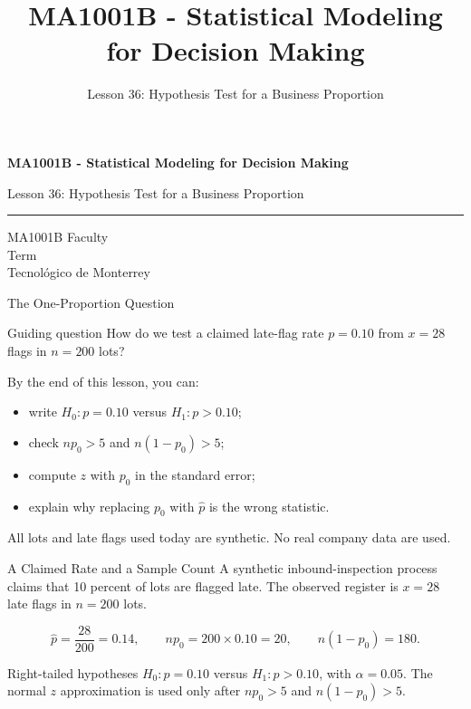 \documentclass[aspectratio=169,10pt,english]{beamer}
\title{MA1001B - Statistical Modeling for Decision Making}
\subtitle{Lesson 36: Hypothesis Test for a Business Proportion}
\author{}
\institute{Tecnol\'ogico de Monterrey}
\date{}
\begin{document}
\begin{frame}[plain]
  \vspace{1.2cm}
  {\Large\bfseries MA1001B - Statistical Modeling for Decision Making\par}
  \vspace{0.7cm}
  {\large Lesson 36: Hypothesis Test for a Business Proportion\par}
  \vspace{0.7cm}
  {\color{TecRojo}\rule{\textwidth}{1.2pt}}
  \vspace{0.8cm}

  MA1001B Faculty\\[0.3cm]
  Term\\[0.3cm]
  Tecnol\'ogico de Monterrey
\end{frame}

\begin{frame}{The One-Proportion Question}
  \begin{alertblock}{Guiding question}
    How do we test a claimed late-flag rate $p=0.10$ from $x=28$ flags in
    $n=200$ lots?
  \end{alertblock}

  \vspace{0.6em}
  By the end of this lesson, you can:
  \begin{itemize}
    \item write $H_0:p=0.10$ versus $H_1:p>0.10$;
    \item check $np_0>5$ and $n(1-p_0)>5$;
    \item compute $z$ with $p_0$ in the standard error;
    \item explain why replacing $p_0$ with $\hat{p}$ is the wrong statistic.
  \end{itemize}

  \vfill
  \scriptsize All lots and late flags used today are synthetic. No real company data are used.
\end{frame}

\begin{frame}{A Claimed Rate and a Sample Count}
  \small
  A synthetic inbound-inspection process claims that 10 percent of lots are
  flagged late. The observed register is $x=28$ late flags in $n=200$ lots.

  \[
    \hat{p}=\frac{28}{200}=0.14,\qquad
    np_0=200\times0.10=20,\qquad
    n(1-p_0)=180.
  \]

  \begin{exampleblock}{Right-tailed hypotheses}
    $H_0:p=0.10$ versus $H_1:p>0.10$, with $\alpha=0.05$. The normal $z$
    approximation is used only after $np_0>5$ and $n(1-p_0)>5$.
  \end{exampleblock}
\end{frame}
\end{document}
